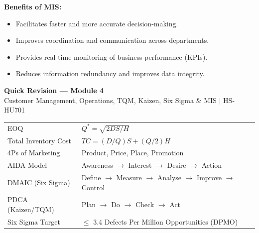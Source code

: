 \documentclass[12pt,a4paper]{article}
\renewcommand{\arraystretch}{1.45}
\begin{document}
\textbf{Benefits of MIS:}
\begin{itemize}[leftmargin=*, itemsep=2pt]
  \item Facilitates faster and more accurate decision-making.
  \item Improves coordination and communication across departments.
  \item Provides real-time monitoring of business performance (KPIs).
  \item Reduces information redundancy and improves data integrity.
\end{itemize}

\newpage
\begin{center}
  {\large\bfseries\color{myred} Quick Revision --- Module 4}\\[3pt]
  {\small\color{mydark} Customer Management, Operations, TQM, Kaizen, Six Sigma \& MIS $|$ HS-HU701}
\end{center}
\noindent{\color{myred}\rule{\linewidth}{1.2pt}}
\vspace{4pt}

\begin{tcolorbox}[formulabox, title={\textbf{Key Formulas and Frameworks at a Glance}}]
\renewcommand{\arraystretch}{1.3}
\begin{tabularx}{\linewidth}{B{4.2cm} X}EOQ & $Q^* = \sqrt{2DS/H}$ \\[4pt]
Total Inventory Cost & $TC = (D/Q)S + (Q/2)H$ \\[4pt]
4Ps of Marketing & Product, Price, Place, Promotion \\[3pt]
AIDA Model & Awareness $\to$ Interest $\to$ Desire $\to$ Action \\[3pt]
DMAIC (Six Sigma) & Define $\to$ Measure $\to$ Analyse $\to$ Improve $\to$ Control \\[3pt]
PDCA (Kaizen/TQM) & Plan $\to$ Do $\to$ Check $\to$ Act \\[3pt]
Six Sigma Target & $\leq$ 3.4 Defects Per Million Opportunities (DPMO) \\
\end{tabularx}
\end{tcolorbox}
\end{document}
